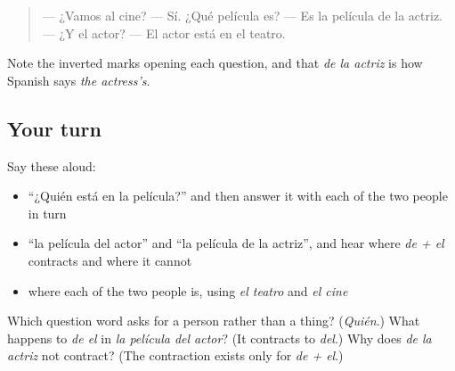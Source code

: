 \begin{tcolorbox}[breakable,skin=enhanced,colback=orange!6,colframe=orange!45!black,boxrule=0.5pt,arc=1mm,left=6pt,right=6pt,top=4pt,bottom=4pt,fonttitle=\bfseries,title={Read this}]
\begin{quote}
— ¿Vamos al cine? — Sí. ¿Qué película es? — Es la película de la actriz. — ¿Y el actor? — El actor está en el teatro.
\end{quote}

Note the inverted marks opening each question, and that \emph{de la actriz} is how Spanish says \emph{the actress's}.
\end{tcolorbox}

\subsection*{Your turn}
Say these aloud:

\begin{itemize}
\raggedright
  \item \textquotedblleft{}¿Quién está en la película?\textquotedblright{} and then answer it with each of the two people in turn
  \item \textquotedblleft{}la película del actor\textquotedblright{} and \textquotedblleft{}la película de la actriz\textquotedblright{}, and hear where \emph{de + el} contracts and where it cannot
  \item where each of the two people is, using \emph{el teatro} and \emph{el cine}
\end{itemize}

\begin{tcolorbox}[breakable,colback=teal!4,colframe=teal!35!black,title={Before you move on}]
Which question word asks for a person rather than a thing? (\emph{Quién}.) What happens to \emph{de el} in \emph{la película del actor}? (It contracts to \emph{del}.) Why does \emph{de la actriz} not contract? (The contraction exists only for \emph{de + el}.)
\end{tcolorbox}
